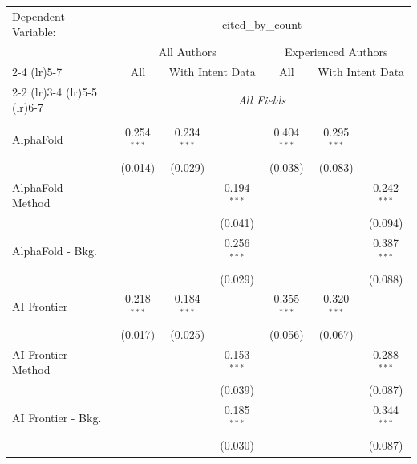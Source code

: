 \begingroup
\centering
\begin{tabular}{lcccccc}
   \tabularnewline \midrule \midrule
   Dependent Variable: & \multicolumn{6}{c}{cited\_by\_count}\\
 & \multicolumn{3}{c}{All Authors} & \multicolumn{3}{c}{Experienced Authors} \\
\cmidrule(lr){2-4} \cmidrule(lr){5-7}
 & \multicolumn{1}{c}{All} & \multicolumn{2}{c}{With Intent Data} & \multicolumn{1}{c}{All} & \multicolumn{2}{c}{With Intent Data} \\
\cmidrule(lr){2-2} \cmidrule(lr){3-4} \cmidrule(lr){5-5} \cmidrule(lr){6-7}
 & \multicolumn{6}{c}{\textit{All Fields}} \\ \\
   AlphaFold            & 0.254$^{***}$ & 0.234$^{***}$ &               & 0.404$^{***}$ & 0.295$^{***}$ &   \\   
                        & (0.014)       & (0.029)       &               & (0.038)       & (0.083)       &   \\   
   AlphaFold - Method   &               &               & 0.194$^{***}$ &               &               & 0.242$^{***}$\\   
                        &               &               & (0.041)       &               &               & (0.094)\\   
   AlphaFold - Bkg.     &               &               & 0.256$^{***}$ &               &               & 0.387$^{***}$\\   
                        &               &               & (0.029)       &               &               & (0.088)\\   
   AI Frontier          & 0.218$^{***}$ & 0.184$^{***}$ &               & 0.355$^{***}$ & 0.320$^{***}$ &   \\   
                        & (0.017)       & (0.025)       &               & (0.056)       & (0.067)       &   \\   
   AI Frontier - Method &               &               & 0.153$^{***}$ &               &               & 0.288$^{***}$\\   
                        &               &               & (0.039)       &               &               & (0.087)\\   
   AI Frontier - Bkg.   &               &               & 0.185$^{***}$ &               &               & 0.344$^{***}$\\   
                        &               &               & (0.030)       &               &               & (0.087)\\   

\end{tabular}
